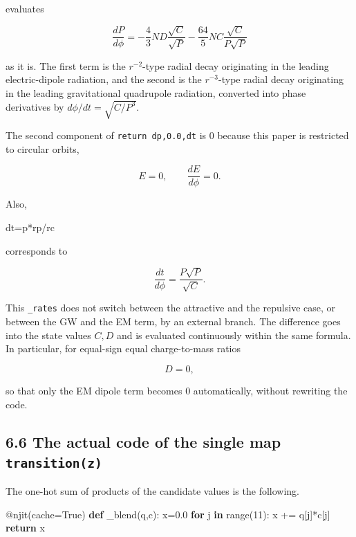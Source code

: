 \documentclass[
  a4paper,
]{article}
\newenvironment{Shaded}{}{}
\newcommand{\AttributeTok}[1]{\textcolor[rgb]{0.49,0.56,0.16}{#1}}
\newcommand{\BuiltInTok}[1]{\textcolor[rgb]{0.00,0.50,0.00}{#1}}
\newcommand{\ControlFlowTok}[1]{\textcolor[rgb]{0.00,0.44,0.13}{\textbf{#1}}}
\newcommand{\DecValTok}[1]{\textcolor[rgb]{0.25,0.63,0.44}{#1}}
\newcommand{\FloatTok}[1]{\textcolor[rgb]{0.25,0.63,0.44}{#1}}
\newcommand{\KeywordTok}[1]{\textcolor[rgb]{0.00,0.44,0.13}{\textbf{#1}}}
\newcommand{\NormalTok}[1]{#1}
\newcommand{\OperatorTok}[1]{\textcolor[rgb]{0.40,0.40,0.40}{#1}}
\newcommand{\VariableTok}[1]{\textcolor[rgb]{0.10,0.09,0.49}{#1}}
\begin{document}
evaluates

\[
\boxed{
\frac{dP}{d\phi}
=
-\frac{4}{3}ND\frac{\sqrt C}{\sqrt P}
-\frac{64}{5}NC\frac{\sqrt C}{P\sqrt P}
}
\]

as it is. The first term is the \(r^{-2}\)-type radial decay originating
in the leading electric-dipole radiation, and the second is the
\(r^{-3}\)-type radial decay originating in the leading gravitational
quadrupole radiation, converted into phase derivatives by
\(d\phi/dt=\sqrt{C/P^3}\).

The second component of \texttt{return\ dp,0.0,dt} is 0 because this
paper is restricted to circular orbits,

\[
E=0,
\qquad
\frac{dE}{d\phi}=0.
\]

Also,

\begin{Shaded}
\begin{Highlighting}[]
\NormalTok{dt}\OperatorTok{=}\NormalTok{p}\OperatorTok{*}\NormalTok{rp}\OperatorTok{/}\NormalTok{rc}
\end{Highlighting}
\end{Shaded}

corresponds to

\[
\boxed{
\frac{dt}{d\phi}
=
\frac{P\sqrt P}{\sqrt C}.
}
\]

This \texttt{\_rates} does not switch between the attractive and the
repulsive case, or between the GW and the EM term, by an external
branch. The difference goes into the state values \(C,D\) and is
evaluated continuously within the same formula. In particular, for
equal-sign equal charge-to-mass ratios

\[
D=0,
\]

so that only the EM dipole term becomes 0 automatically, without
rewriting the code.

\subsection{\texorpdfstring{6.6 The actual code of the single map
\texttt{transition(z)}}{6.6 The actual code of the single map transition(z)}}\label{the-actual-code-of-the-single-map-transitionz}

The one-hot sum of products of the candidate values is the following.

\begin{Shaded}
\begin{Highlighting}[]
\AttributeTok{@njit}\NormalTok{(cache}\OperatorTok{=}\VariableTok{True}\NormalTok{)}
\KeywordTok{def}\NormalTok{ \_blend(q,c):}
\NormalTok{    x}\OperatorTok{=}\FloatTok{0.0}
    \ControlFlowTok{for}\NormalTok{ j }\KeywordTok{in} \BuiltInTok{range}\NormalTok{(}\DecValTok{11}\NormalTok{): x }\OperatorTok{+=}\NormalTok{ q[j]}\OperatorTok{*}\NormalTok{c[j]}
    \ControlFlowTok{return}\NormalTok{ x}
\end{Highlighting}
\end{Shaded}
\end{document}
